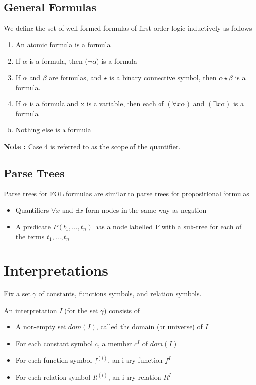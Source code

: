 \documentclass{article}
\begin{document}
\subsection{General Formulas}
We define the set of well formed formulas of first-order logic inductively as follows 
\begin{enumerate}
\item An atomic formula is a formula
\item If \(\alpha\) is a formula, then (\(\neg \alpha\)) is a formula
\item If \(\alpha\) and \(\beta\) are formulas, and \(\star\) is a binary connective symbol, then \(\alpha \star \beta\) is a formula.
\item If \(\alpha\) is a formula and x is a variable, then each of \((\forall x \alpha)\) and \((\exists x \alpha)\) is a formula 
\item Nothing else is a formula 
\end{enumerate}

\textbf{Note : } Case 4 is referred to as the scope of the quantifier. 

\subsection{Parse Trees}
Parse trees for FOL formulas are similar to parse trees for propositional formulas
\begin{itemize}
\item Quantifiers \(\forall x\) and \(\exists x\) form nodes in the same way as negation 
\item A predicate \(P(t_1, \ldots, t_n)\) has a node labelled P with a sub-tree for each of the terms \(t_1, \ldots, t_n\)
\end{itemize}

\section{Interpretations}

Fix a set \(\gamma\) of constants, functions symbols, and relation symbols. 

An interpretation  \(I\) (for the set \(\gamma\)) consists of 
\begin{itemize}
\item A non-empty set \(dom(I)\), called the domain (or universe) of \(I\)
\item For each constant symbol c, a member \(c^I\) of \(dom(I)\) 
\item For each function symbol \(f^{(i)}\), an i-ary function \(f^{I}\)
\item For each relation symbol \(R^{(i)}\), an i-ary relation \(R^I\)
\end{itemize}
\end{document}
